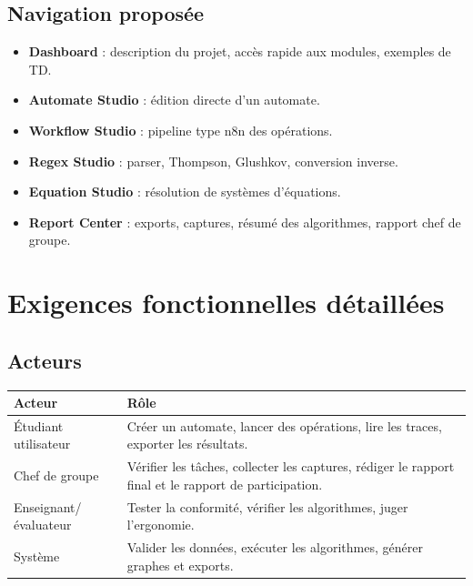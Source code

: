\documentclass[11pt,a4paper]{report}
\begin{document}
\section{Navigation proposée}
\begin{itemize}
  \item \textbf{Dashboard} : description du projet, accès rapide aux modules, exemples de TD.
  \item \textbf{Automate Studio} : édition directe d'un automate.
  \item \textbf{Workflow Studio} : pipeline type n8n des opérations.
  \item \textbf{Regex Studio} : parser, Thompson, Glushkov, conversion inverse.
  \item \textbf{Equation Studio} : résolution de systèmes d'équations.
  \item \textbf{Report Center} : exports, captures, résumé des algorithmes, rapport chef de groupe.
\end{itemize}

\chapter{Exigences fonctionnelles détaillées}

\section{Acteurs}
\begin{longtable}{p{}p{}}
\toprule
\textbf{Acteur} & \textbf{Rôle}\\
\midrule
Étudiant utilisateur & Créer un automate, lancer des opérations, lire les traces, exporter les résultats.\\
Chef de groupe & Vérifier les tâches, collecter les captures, rédiger le rapport final et le rapport de participation.\\
Enseignant/évaluateur & Tester la conformité, vérifier les algorithmes, juger l'ergonomie.\\
Système & Valider les données, exécuter les algorithmes, générer graphes et exports.\\
\bottomrule
\end{longtable}
\end{document}
